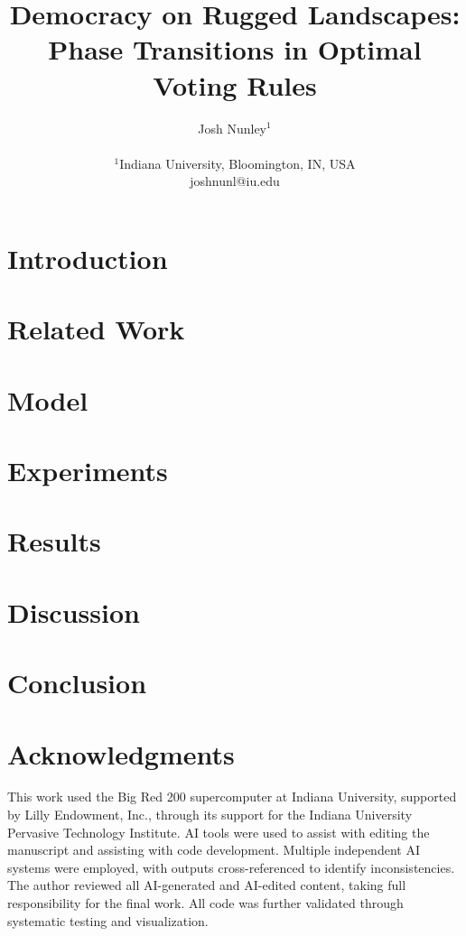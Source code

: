 \documentclass[letterpaper]{article}
\title{Democracy on Rugged Landscapes: Phase Transitions in Optimal Voting Rules}
\author{
    Josh Nunley$^{1}$ \\
    \mbox{}\\
    $^1$Indiana University, Bloomington, IN, USA \\
    joshnunl@iu.edu
}
\begin{document}
\maketitle

\begin{abstract}

\end{abstract}

\section{Introduction}


\section{Related Work}


\section{Model}


\section{Experiments}


\section{Results}


\section{Discussion}


\section{Conclusion}


\section{Acknowledgments}
This work used the Big Red 200 supercomputer at Indiana University, supported by
Lilly Endowment, Inc., through its support for the Indiana University Pervasive
Technology Institute. AI tools were used to assist with editing the manuscript and
assisting with code development. Multiple independent AI systems were employed, with
outputs cross-referenced to identify inconsistencies. The author reviewed all
AI-generated and AI-edited content, taking full responsibility for the final
work. All code was further validated through systematic testing and
visualization.

\footnotesize


\end{document}
